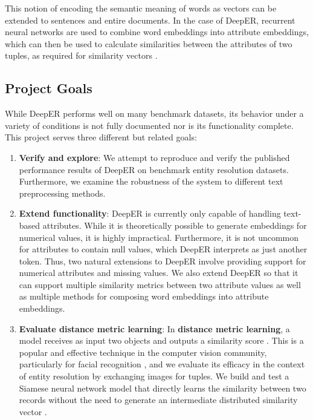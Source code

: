 \documentclass{proc}
\begin{document}
This notion of encoding the semantic meaning of words as vectors can be extended to sentences and entire documents. In the case of DeepER, recurrent neural networks are used to combine word embeddings into attribute embeddings, which can then be used to calculate similarities between the attributes of two tuples, as required for similarity vectors \cite{ebraheem-deep-er}.

\subsection{Project Goals}

While DeepER performs well on many benchmark datasets, its behavior under a variety of conditions is not fully documented nor is its functionality complete. This project serves three different but related goals:
\begin{enumerate}
\item{\textbf{Verify and explore}:} We attempt to reproduce and verify the published performance results of DeepER on benchmark entity resolution datasets. Furthermore, we examine the robustness of the system to different text preprocessing methods.
\item{\textbf{Extend functionality}:} DeepER is currently only capable of handling text-based attributes. While it is theoretically possible to generate embeddings for numerical values, it is highly impractical. Furthermore, it is not uncommon for attributes to contain null values, which DeepER interprets as just another token. Thus, two natural extensions to DeepER involve providing support for numerical attributes and missing values. We also extend DeepER so that it can support multiple similarity metrics between two attribute values as well as multiple methods for composing word embeddings into attribute embeddings.
\item{\textbf{Evaluate distance metric learning}:} In \textbf{distance metric learning}, a model receives as input two objects and outputs a similarity score \cite{yang-distance}. This is a popular and effective technique in the computer vision community, particularly for facial recognition \cite{schroff-facenet}, and we evaluate its efficacy in the context of entity resolution by exchanging images for tuples. We build and test a Siamese neural network model that directly learns the similarity between two records without the need to generate an intermediate distributed similarity vector \cite{mueller-siamese}.
\end{enumerate}
\end{document}
